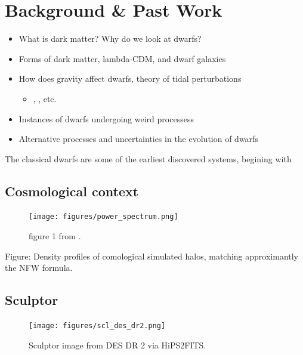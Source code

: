 \section{Background \& Past Work}\label{background-past-work}

\begin{itemize}
\tightlist
\item
  What is dark matter? Why do we look at dwarfs?
\item
  Forms of dark matter, lambda-CDM, and dwarf galaxies
\item
  How does gravity affect dwarfs, theory of tidal perturbations

  \begin{itemize}
  \tightlist
  \item
    \citet{EN2021}, \citet{PNM2008}, etc.
  \end{itemize}
\item
  Instances of dwarfs undergoing weird processess
\item
  Alternative processes and uncertainties in the evolution of dwarfs
\end{itemize}

The classical dwarfs are some of the earliest discovered systems,
begining with \citet{shapley1938}

\subsection{Cosmological context}\label{cosmological-context}

\begin{figure}
\centering
\texttt{[image: figures/power\_spectrum.png]}
\caption[Cosmological Power Spectrum]{figure 1 from
\citet{bechtol+2022}.}\label{fig:cosmological_power_spectrum}
\end{figure}

Figure: Density profiles of comological simulated halos, matching
approximantly the NFW formula.

\subsection{Sculptor}\label{sculptor}

\begin{figure}
\centering
\texttt{[image: figures/scl\_des\_dr2.png]}
\caption[Picture of Sculptor]{Sculptor image from DES DR 2 via
HiPS2FITS.}\label{fig:scl_image}
\end{figure}

